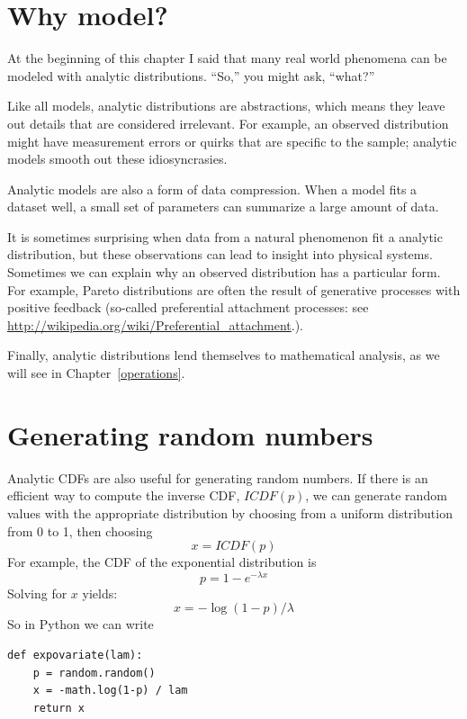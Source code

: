 \documentclass[12pt]{book}
\begin{document}
\section{Why model?}

At the beginning of this chapter I said that many real world phenomena
can be modeled with analytic distributions.  ``So,'' you might ask,
``what?''

Like all models, analytic distributions are abstractions, which
means they leave out details that are considered irrelevant.
For example, an observed distribution might have measurement errors
or quirks that are specific to the sample; analytic models smooth
out these idiosyncrasies.

Analytic models are also a form of data compression.  When a model
fits a dataset well, a small set of parameters can summarize a
large amount of data.

It is sometimes surprising when data from a natural phenomenon fit a
analytic distribution, but these observations can lead to insight
into physical systems.  Sometimes we can explain why an observed
distribution has a particular form.  For example, Pareto distributions
are often the result of generative processes with positive feedback
(so-called preferential attachment processes: see
\url{http://wikipedia.org/wiki/Preferential_attachment}.).

Finally, analytic distributions lend themselves to mathematical
analysis, as we will see in Chapter~\ref{operations}.


\section{Generating random numbers}

Analytic CDFs are also useful for generating random numbers.
If there is an efficient way to compute the inverse CDF, $ICDF(p)$,
we can generate random values with the appropriate distribution
by choosing from a uniform distribution from 0 to 1, then choosing
%
\[ x = ICDF(p)\]
%
For example, the CDF of the exponential distribution is
%
\[ p = 1 - e^{-\lambda x} \]
%
Solving for $x$ yields:
%
\[ x = -\log (1 - p) / \lambda \]
%
So in Python we can write
%
\begin{verbatim}
def expovariate(lam):
    p = random.random()
    x = -math.log(1-p) / lam
    return x
\end{verbatim}
\end{document}
